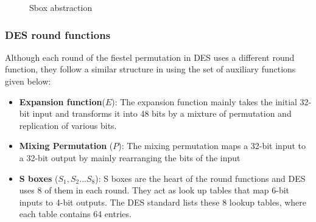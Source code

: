 \begin{figure}%
\center
{}

\caption{Sbox abstraction}
\label{fig:sbox}
\end{figure}

\subsubsection*{DES round functions} Although each round of the fiestel permutation in DES uses a different round function, they follow a similar structure in using the set of auxiliary functions given below: \newline
\begin{itemize}
  \item \textbf{Expansion function}($E$): The expansion function mainly takes the initial 32-bit input and transforms it into 48 bits by a mixture of permutation and replication of various bits.
  \item \textbf{Mixing Permutation} ($P$): The mixing permutation maps a 32-bit input to a 32-bit output by mainly rearranging the bits of the input
  \item \textbf{S boxes} ($S_1, S_2 ... S_8$): S boxes are the heart of the round functions and DES uses 8 of them in each round. They act as look up tables that map 6-bit inputs to 4-bit outputs. The DES standard lists these 8 lookup tables, where each table contains 64 entries.
\end{itemize}

